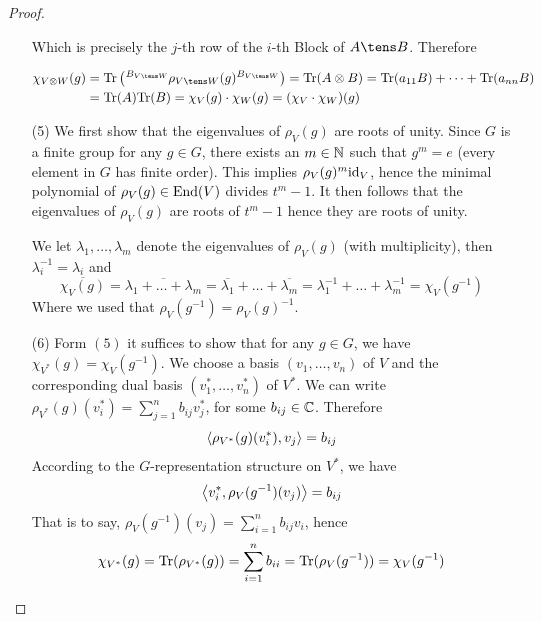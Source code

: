 \documentclass[twoside = false,	%
		headsepline,		%
		parskip = true,
		]{scrbook}						%
\begin{document}
\begin{proof}
\begin{enumerate}
                    Which is precisely the $j$-th row of the $i$-th Block of $A \tens B$. Therefore
                    
                    \begin{equation*}
                    \begin{split}
                        \chi_{V\otimes W}(g) &= \Tr \round{\tensor[^{B_{V \tens W}}]{\rho_{V \tens W}(g)}{^{B_{V \tens W}}}} = \Tr(A\otimes B) = \Tr(a_{11}B) + \dots + \Tr(a_{nn}B) \\
                        &= \Tr(A)\Tr(B) = \chi_V(g) \cdot \chi_W(g) = (\chi_V \cdot \chi_W)(g)
                    \end{split}
                    \end{equation*}
                \item[(5)]
                    We first show that the eigenvalues of $\rho_V(g)$ are roots of unity. Since $G$ is a finite group for any $g \in G$, there exists an $m \in \mathbb N$ such that $g^m = e$ (every element in $G$ has finite order). This implies $\rho_V(g)^m  \mathrm{id}_V$, hence the minimal polynomial of $\rho_V(g) \in \mathrm{End}(V)$ divides $t^m - 1$. It then follows that the eigenvalues of $\rho_V(g)$ are roots of $t^m - 1$ hence they are roots of unity.

                    We let $\lambda_1,\dots,\lambda_m$ denote the eigenvalues of $\rho_V(g)$ (with multiplicity), then $\lambda_i^{-1} = \lambda_i$ and
                    \begin{equation*}
                        \overline{\chi_V(g)} = \overline{\lambda_1 + \dots + \lambda_m} = \overline{\lambda_1} + \dots + \overline{\lambda_m} = \lambda_1^{-1} + \dots + \lambda_m^{-1} = \chi_V(g^{-1})
                    \end{equation*}
                    Where we used that $\rho_V(g^{-1}) = \rho_V(g)^{-1}$.
                \item[(6)]
                    Form $(5)$ it suffices to show that for any $g\in G$, we have $\chi_{V^*}(g) = \chi_V(g^{-1})$. We choose a basis $(v_1,\dots,v_n)$ of $V$ and the corresponding dual basis $(v_1^*,\dots,v_n^*)$ of $V^*$. We can write $\rho_{V^*}(g)(v_i^*) = \sum_{j=1}^n b_{ij} v_j^*$, for some $b_{ij} \in \mathbb C$. Therefore
                    \begin{equation*}
                        \left\langle \rho_{V^*}(g)(v_i^*),v_j\right\rangle = b_{ij}
                    \end{equation*}
                    According to the $G$-representation structure on $V^*$, we have
                    \begin{equation*}
                        \left\langle v_i^*,\rho_V(g^{-1})(v_j)\right\rangle = b_{ij}
                    \end{equation*}
                    That is to say, $\rho_V(g^{-1})(v_j) = \sum \limits_{i=1}^n b_{ij} v_i$, hence
                    \begin{equation*}
                        \chi_{V^*}(g) = \mathrm{Tr}(\rho_{V^*}(g)) = \sum_{i=1}^n b_{ii} = \mathrm{Tr}(\rho_V(g^{-1})) = \chi_V(g^{-1})
                    \end{equation*}
            \end{enumerate}
        \end{proof}
\end{document}

